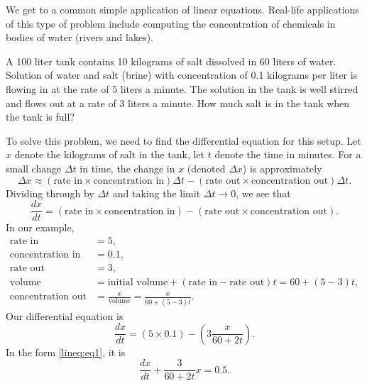 \begin{example}
We get to a common
simple application of linear equations.
Real-life applications of this type of problem include
computing the concentration of
chemicals in bodies of water (rivers and lakes).

\begin{mywrapfigsimp}{1.60in}{1.65in}
\noindent
{}
\end{mywrapfigsimp}
A 100 liter tank contains 10 kilograms of salt dissolved in 60 liters of
water.  Solution of water and salt (brine) with concentration of 0.1
kilograms per
liter is flowing in at the rate of 5 liters a minute.  The solution
in the tank is well stirred and flows out at a rate of 3 liters a minute.
How much salt is in the tank when the tank is full?

To solve this problem, we need to find the differential equation
for this setup.
Let $x$ denote the kilograms of salt in the tank,
let $t$ denote the time in minutes.  For a small change $\Delta t$ in
time, the change in $x$ (denoted $\Delta x$) is approximately
\begin{equation*}
\Delta x \approx
(\text{rate in} \times \text{concentration in}) \Delta t - 
(\text{rate out} \times \text{concentration out}) \Delta t .
\end{equation*}
Dividing through by $\Delta t$ and
taking the limit $\Delta t \to 0$, we see that
\begin{equation*}
\frac{dx}{dt} =
(\text{rate in} \times \text{concentration in})  - 
(\text{rate out} \times \text{concentration out}) .
\end{equation*}
In our example,
\begin{equation*}
\begin{aligned}
\text{rate in} &= 5 , \\
\text{concentration in} &= 0.1 , \\
\text{rate out} &= 3 , \\
\text{volume} &= \text{initial volume} + (\text{rate in} - \text{rate out})t
= 60+(5-3)t, \\
\text{concentration out} &= \frac{x}{\text{volume}} = \frac{x}{60+(5-3)t} .
\end{aligned}
\end{equation*}
Our differential equation is
\begin{equation*}
\frac{dx}{dt} =
(5 \times 0.1)  - 
\left(3 \frac{x}{60+2t}\right) .
\end{equation*}
In the form \eqref{lineq:eq1}, it is
\begin{equation*}
\frac{dx}{dt} +
\frac{3}{60+2t} x
=
0.5 .
\end{equation*}


\end{example}
